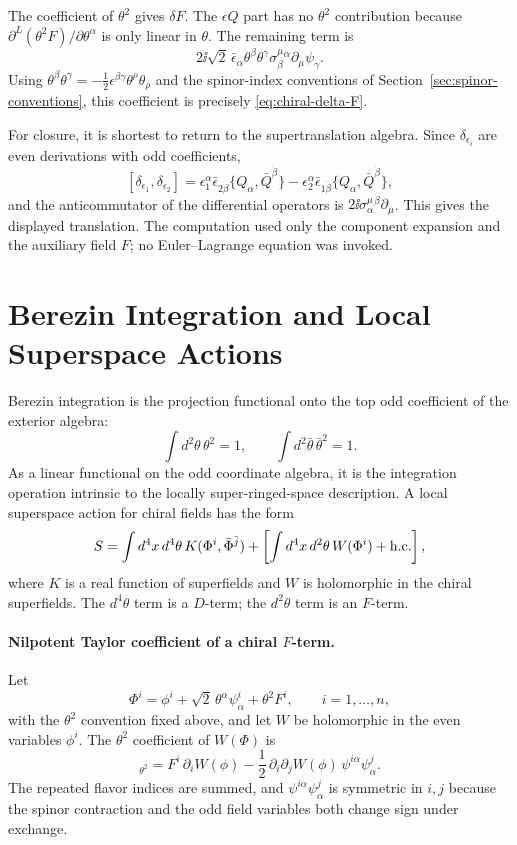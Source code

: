 The coefficient of \(\theta^2\) gives \(\delta F\).  The
\(\epsilon Q\) part has no \(\theta^2\) contribution because
\(\partial^L(\theta^2F)/\partial\theta^\alpha\) is only linear in \(\theta\).
The remaining term is
\[
  2\ii\sqrt2\,\bar\epsilon_{\dot\alpha}
  \theta^\beta\theta^\gamma
  \sigma^\mu_{\beta}{}^{\dot\alpha}
  \partial_\mu\psi_\gamma .
\]
Using
\(\theta^\beta\theta^\gamma
=-\frac12\epsilon^{\beta\gamma}\theta^\rho\theta_\rho\)
and the spinor-index conventions of
Section~\ref{sec:spinor-conventions}, this coefficient is precisely
\eqref{eq:chiral-delta-F}.

For closure, it is shortest to return to the supertranslation algebra.  Since
\(\delta_{\epsilon_i}\) are even derivations with odd coefficients,
\[
  [\delta_{\epsilon_1},\delta_{\epsilon_2}]
  =
  \epsilon_1^\alpha\bar\epsilon_{2\dot\beta}
  \{Q_\alpha,\bar Q^{\dot\beta}\}
  -
  \epsilon_2^\alpha\bar\epsilon_{1\dot\beta}
  \{Q_\alpha,\bar Q^{\dot\beta}\},
\]
and the anticommutator of the differential operators is
\(2\ii\sigma^\mu_{\alpha}{}^{\dot\beta}\partial_\mu\).  This gives the
displayed translation.  The computation used only the component expansion and
the auxiliary field \(F\); no Euler--Lagrange equation was invoked.

\section{Berezin Integration and Local Superspace Actions}

Berezin integration is the projection functional onto the top odd coefficient
of the exterior algebra:
\[
  \int d^2\theta\,\theta^2=1,\qquad
  \int d^2\bar\theta\,\bar\theta^2=1.
\]
As a linear functional on the odd coordinate algebra, it is the integration
operation intrinsic to the locally super-ringed-space description.  A local
superspace action for chiral fields has the form
\[
  S
  =
  \int d^4x\,d^4\theta\,K(\Phi^i,\bar\Phi^{\bar j})
  +
  \left[
  \int d^4x\,d^2\theta\,W(\Phi^i)+{\rm h.c.}
  \right],
\]
where \(K\) is a real function of superfields and \(W\) is holomorphic in the
chiral superfields.  The \(d^4\theta\) term is a \(D\)-term; the
\(d^2\theta\) term is an \(F\)-term.

\paragraph{Nilpotent Taylor coefficient of a chiral \(F\)-term.}
Let
\[
  \Phi^i=\phi^i+\sqrt2\,\theta^\alpha\psi^i_\alpha+\theta^2F^i,
  \qquad i=1,\ldots,n,
\]
with the \(\theta^2\) convention fixed above, and let \(W\) be holomorphic in
the even variables \(\phi^i\).  The \(\theta^2\) coefficient of \(W(\Phi)\)
is
\begin{equation}
  [W(\Phi)]_{\theta^2}
  =
  F^i\,\partial_iW(\phi)
  -
  \frac12\,\partial_i\partial_jW(\phi)\,
  \psi^{i\alpha}\psi^j_\alpha .
  \label{eq:chiral-f-term-taylor-coefficient}
\end{equation}
The repeated flavor indices are summed, and
\(\psi^{i\alpha}\psi^j_\alpha\) is symmetric in \(i,j\) because the spinor
contraction and the odd field variables both change sign under exchange.

